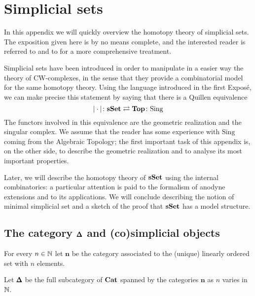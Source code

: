 \chapter{Simplicial sets}

\begin{refsection}

In this appendix we will quickly overview the homotopy theory of simplicial sets. The exposition given here is by no means complete, and the interested reader is referred to \cite{may} and to \cite[Chapter 1]{gj} for a more comprehensive treatment.

Simplicial sets have been introduced in order to manipulate in a easier way the theory of CW-complexes, in the sense that they provide a combinatorial model for the same homotopy theory. Using the language introduced in the first Expos\'e, we can make precise this statement by saying that there is a Quillen equivalence
\[
|\cdot| \colon \mathbf{sSet} \rightleftarrows \mathbf{Top} \colon \mathrm{Sing}
\]
The functors involved in this equivalence are the geometric realization and the singular complex. We assume that the reader has some experience with $\mathrm{Sing}$ coming from the Algebraic Topology; the first important task of this appendix is, on the other side, to describe the geometric realization and to analyse its most important properties.

Later, we will describe the homotopy theory of $\mathbf{sSet}$ using the internal combinatorics: a particular attention is paid to the formalism of anodyne extensions and to its applications. We will conclude describing the notion of minimal simplicial set and a sketch of the proof that $\mathbf{sSet}$ has a model structure.

\section{The category \texorpdfstring{$\pmb{\Delta}$}{\textbackslash Delta} and (co)simplicial objects}

\begin{notation}
For every $n \in \mathbb{N}$ let $\mathbf n$ be the category associated to the (unique) linearly ordered set with $n$ elements.
\end{notation}

\begin{defin}
Let $\pmb{\Delta}$ be the full subcategory of $\mathbf{Cat}$ spanned by the categories $\mathbf n$ as $n$ varies in $\mathbb{N}$.
\end{defin}


\end{refsection}
